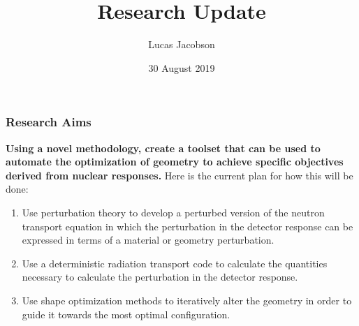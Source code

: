 \documentclass[t]{beamer}
\title{Research Update}
\author{Lucas Jacobson}
\institute{University of Wisconsin--Madison}
\date{30 August 2019}
\begin{document}


\begin{frame}
  \titlepage
\end{frame}



\begin{frame}
  \frametitle{Research Aims}
  \textbf{Using a novel methodology, create a toolset that can be used to
  automate the optimization of geometry to achieve specific objectives derived
  from nuclear responses.}
  \newline\newline
  Here is the current plan for how this will be done:
  \begin{enumerate}[1]
    \item Use perturbation theory to develop a perturbed version of the neutron
          transport equation in which the perturbation in the detector response
          can be expressed in terms of a material or geometry perturbation.
    \item Use a deterministic radiation transport code to calculate the
          quantities necessary to calculate the perturbation in the detector
          response.
    \item Use shape optimization methods to iteratively alter the geometry in
          order to guide it towards the most optimal configuration.
  \end{enumerate}
\end{frame}


\end{document}
